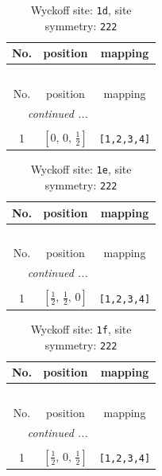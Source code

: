 \documentclass[fleqn,8pt]{jsarticle}
\begin{document}
\renewcommand{\arraystretch}{1.2}
\begin{longtable}{ccc}
\caption{Wyckoff site: {\tt 1d}, site symmetry: {\tt 222}}
 \\
 \hline \hline
No. & position & mapping \\ \hline \endfirsthead

\multicolumn{2}{l}{\tablename\ \thetable{}} \\
 \hline \hline
No. & position & mapping \\ \hline \endhead

 \hline \hline
\multicolumn{2}{r}{\footnotesize\it continued ...} \\ \endfoot

 \hline \hline
\multicolumn{2}{r}{} \\ \endlastfoot

1 & $\left[ 0,\, 0,\, \frac{1}{2} \right]$ & {\tt [1,2,3,4]} \\
\end{longtable}
\renewcommand{\arraystretch}{1.2}
\begin{longtable}{ccc}
\caption{Wyckoff site: {\tt 1e}, site symmetry: {\tt 222}}
 \\
 \hline \hline
No. & position & mapping \\ \hline \endfirsthead

\multicolumn{2}{l}{\tablename\ \thetable{}} \\
 \hline \hline
No. & position & mapping \\ \hline \endhead

 \hline \hline
\multicolumn{2}{r}{\footnotesize\it continued ...} \\ \endfoot

 \hline \hline
\multicolumn{2}{r}{} \\ \endlastfoot

1 & $\left[ \frac{1}{2},\, \frac{1}{2},\, 0 \right]$ & {\tt [1,2,3,4]} \\
\end{longtable}
\renewcommand{\arraystretch}{1.2}
\begin{longtable}{ccc}
\caption{Wyckoff site: {\tt 1f}, site symmetry: {\tt 222}}
 \\
 \hline \hline
No. & position & mapping \\ \hline \endfirsthead

\multicolumn{2}{l}{\tablename\ \thetable{}} \\
 \hline \hline
No. & position & mapping \\ \hline \endhead

 \hline \hline
\multicolumn{2}{r}{\footnotesize\it continued ...} \\ \endfoot

 \hline \hline
\multicolumn{2}{r}{} \\ \endlastfoot

1 & $\left[ \frac{1}{2},\, 0,\, \frac{1}{2} \right]$ & {\tt [1,2,3,4]} \\
\end{longtable}
\end{document}
